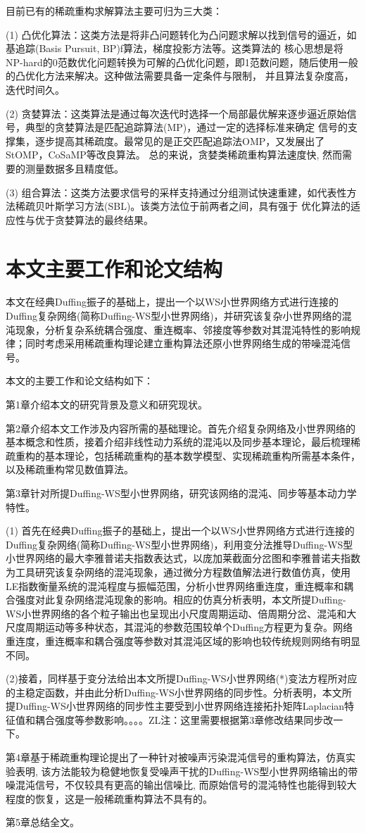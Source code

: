 目前已有的稀疏重构求解算法主要可归为三大类： 

(1)	凸优化算法：这类方法是将非凸问题转化为凸问题求解以找到信号的逼近，如基追踪(Basis Pursuit, BP)f算法，梯度投影方法等。这类算法的
核心思想是将NP-hard的0范数优化问题转换为可解的凸优化问题，即1范数问题，随后使用一般的凸优化方法来解决。这种做法需要具备一定条件与限制，
并且算法复杂度高，迭代时间久。

(2)	贪婪算法：这类算法是通过每次迭代时选择一个局部最优解来逐步逼近原始信号，典型的贪婪算法是匹配追踪算法(MP)，通过一定的选择标准来确定
信号的支撑集，逐步提高其稀疏度。最常见的是正交匹配追踪法OMP，又发展出了StOMP，CoSaMP等改良算法。
总的来说，贪婪类稀疏重构算法速度快, 然而需要的测量数据多且精度低。

(3)	组合算法：这类方法要求信号的采样支持通过分组测试快速重建，如代表性方法稀疏贝叶斯学习方法(SBL)。该类方法位于前两者之间，具有强于
优化算法的适应性与优于贪婪算法的最终结果。
\section{本文主要工作和论文结构}
本文在经典Duffing振子的基础上，提出一个以WS小世界网络方式进行连接的Duffing复杂网络(简称Duffing-WS型小世界网络)，并研究该复杂小世界网络的混沌现象，分析复杂系统耦合强度、重连概率、邻接度等参数对其混沌特性的影响规律；同时考虑采用稀疏重构理论建立重构算法还原小世界网络生成的带噪混沌信号。

本文的主要工作和论文结构如下：

第1章介绍本文的研究背景及意义和研究现状。

第2章介绍本文工作涉及内容所需的基础理论。首先介绍复杂网络及小世界网络的基本概念和性质，接着介绍非线性动力系统的混沌以及同步基本理论，最后梳理稀疏重构的基本理论，包括稀疏重构的基本数学模型、实现稀疏重构所需基本条件，以及稀疏重构常见数值算法。

第3章针对所提Duffing-WS型小世界网络，研究该网络的混沌、同步等基本动力学特性。

(1) 首先在经典Duffing振子的基础上，提出一个以WS小世界网络方式进行连接的Duffing复杂网络(简称Duffing-WS型小世界网络)，利用变分法推导Duffing-WS型小世界网络的最大李雅普诺夫指数表达式，以庞加莱截面分岔图和李雅普诺夫指数为工具研究该复杂网络的混沌现象，通过微分方程数值解法进行数值仿真，使用LE指数衡量系统的混沌程度与振幅范围，分析小世界网络重连度，重连概率和耦合强度对此复杂网络混沌现象的影响。相应的仿真分析表明，本文所提Duffing-WS小世界网络的各个粒子输出也呈现出小尺度周期运动、倍周期分岔、混沌和大尺度周期运动等多种状态，其混沌的参数范围较单个Duffing方程更为复杂。网络重连度，重连概率和耦合强度等参数对其混沌区域的影响也较传统规则网络有明显不同。

(2)接着，同样基于变分法给出本文所提Duffing-WS小世界网络(*)变法方程所对应的主稳定函数，并由此分析Duffing-WS小世界网络的同步性。分析表明，本文所提Duffing-WS小世界网络的同步性主要受到小世界网络连接拓扑矩阵Laplacian特征值和耦合强度等参数影响\textcolor[rgb]{0.00,0.00,1.00}{。。。。ZL注：这里需要根据第3章修改结果同步改一下。}

第4章基于稀疏重构理论提出了一种针对被噪声污染混沌信号的重构算法，仿真实验表明, 该方法能较为稳健地恢复受噪声干扰的Duffing-WS型小世界网络输出的带噪混沌信号，不仅较具有更高的输出信噪比, 而原始信号的混沌特性也能得到较大程度的恢复，这是一般稀疏重构算法不具有的。

第5章总结全文。
